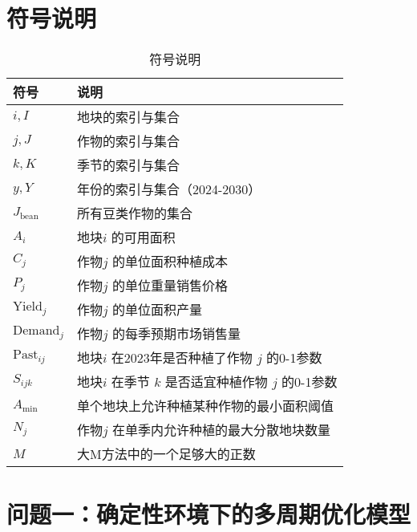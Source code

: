 \documentclass[withoutpreface,bwprint]{cumcmthesis} %
\begin{document}
\section{符号说明}

\begin{table}[H]
	\centering
	\caption{符号说明}
	\begin{tabular}{ll}
		\toprule
		符号                 & 说明                                \\
		\midrule

		$i, I$             & 地块的索引与集合                          \\
		$j, J$             & 作物的索引与集合                          \\
		$k, K$             & 季节的索引与集合                          \\
		$y, Y$             & 年份的索引与集合（2024-2030）               \\
		$J_{\text{bean}}$  & 所有豆类作物的集合                         \\

		$A_i$              & 地块$i$ 的可用面积                       \\
		$C_j$              & 作物$j$ 的单位面积种植成本                   \\
		$P_j$              & 作物$j$ 的单位重量销售价格                   \\
		$\text{Yield}_j$   & 作物$j$ 的单位面积产量                     \\
		$\text{Demand}_j$  & 作物$j$ 的每季预期市场销售量                  \\
		$\text{Past}_{ij}$ & 地块$i$ 在2023年是否种植了作物 $j$ 的0-1参数    \\
		$S_{ijk}$          & 地块$i$ 在季节 $k$ 是否适宜种植作物 $j$ 的0-1参数 \\
		$A_{\min}$         & 单个地块上允许种植某种作物的最小面积阈值              \\
		$N_j$              & 作物$j$ 在单季内允许种植的最大分散地块数量           \\
		$M$                & 大M方法中的一个足够大的正数                    \\
		\bottomrule
	\end{tabular}
\end{table}




\section{问题一：确定性环境下的多周期优化模型}
\end{document}
